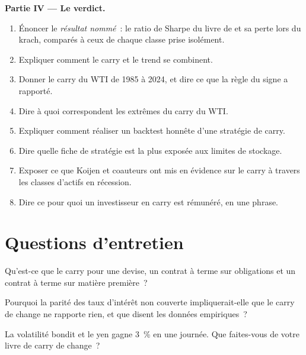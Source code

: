 \begin{problem}
\medskip\noindent\textbf{Partie IV --- Le verdict.}
\begin{enumerate}[resume]
\item Énoncer le \emph{résultat nommé}~: le ratio de Sharpe du livre de  et sa perte lors du krach, comparés à ceux de chaque classe prise isolément.
\item Expliquer comment le carry et le trend se combinent.
\item Donner le carry du WTI de 1985 à 2024, et dire ce que la règle du signe a rapporté.
\item Dire à quoi correspondent les extrêmes du carry du WTI.
\item Expliquer comment réaliser un backtest honnête d'une stratégie de carry.
\item Dire quelle fiche de stratégie est la plus exposée aux limites de stockage.
\item Exposer ce que Koijen et coauteurs ont mis en évidence sur le carry à travers les classes d'actifs en récession.
\item Dire ce pour quoi un investisseur en carry est rémunéré, en une phrase.
\end{enumerate}
\end{problem}

\section{Questions d'entretien}

\begin{interviewq}\label{iq:s1:carry-across-asset-classes:1}
Qu'est-ce que le carry pour une devise, un contrat à terme sur obligations et un contrat à terme sur matière première~?
\end{interviewq}

\begin{interviewq}\label{iq:s1:carry-across-asset-classes:2}
Pourquoi la parité des taux d'intérêt non couverte impliquerait-elle que le carry de change ne rapporte rien, et que disent les données empiriques~?
\end{interviewq}

\begin{interviewq}\label{iq:s1:carry-across-asset-classes:3}
La volatilité bondit et le yen gagne 3~\% en une journée. Que faites-vous de votre livre de carry de change~?
\end{interviewq}

